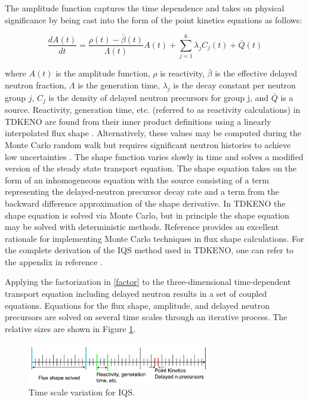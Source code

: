 \documentclass{anstrans}
\begin{document}
The amplitude function captures the time dependence and takes on physical significance by being cast into the form of the point kinetics equations as follows:

\begin{equation}
    \label{eq:pt_kin}
    \frac{dA(t)}{dt} = \frac{\rho(t)-\bar{\beta}(t)}{\Lambda(t)} A(t) + \sum_{j=1}^{6} \lambda_jC_j(t) + \bar{Q}(t)
\end{equation}

where $A(t)$ is the amplitude function, $\rho$ is reactivity, $\bar{\beta}$ is the effective delayed neutron fraction, $\Lambda$ is the generation time, $\lambda_j$ is the decay constant per neutron group $j$, $C_j$ is the density of delayed neutron precursors for group j, and $\bar{Q}$ is a source.  
 Reactivity, generation time, etc. (referred to as reactivity calculations) in TDKENO are found from their inner product definitions using a linearly interpolated flux shape \cite{Bentley}.  Alternatively, these values may be computed during the Monte Carlo random walk but requires significant neutron histories to achieve low uncertainties \cite{Waddell}.  The shape function varies slowly in time and solves a modified version of the steady state transport equation.  The shape equation takes on the form of an inhomogeneous equation with the source consisting of a term representing the delayed-neutron precursor decay rate and a term from the backward difference approximation of the shape derivative.  In TDKENO the shape equation is solved via Monte Carlo, but in principle the shape equation may be solved with deterministic methods.  Reference \cite{Shayesteh} provides an excellent rationale for implementing Monte Carlo techniques in flux shape calculations.  For the complete derivation of the IQS method used in TDKENO, one can refer to the appendix in reference \cite{Bentley}. 

Applying the factorization in \ref{factor} to the three-dimensional time-dependent transport equation including delayed neutron results in a set of coupled equations.  Equations for the flux shape, amplitude, and delayed neutron precursors are solved on several time scales through an iterative process. The relative sizes are shown in Figure \ref{fig:time_scale}. 

\begin{figure}[h]
    \centering
    \includegraphics[width=8cm]{figures/time_scale.pdf}
    \caption{Time scale variation for IQS.}
    \label{fig:time_scale}
\end{figure}
\end{document}
